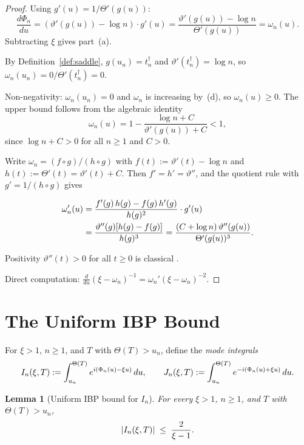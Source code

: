 \documentclass{amsart}
\newcommand{\assign}{:=}
\newcommand{\tmem}[1]{{\em #1\/}}
\newcommand{\tmtextbf}[1]{\text{{\bfseries{#1}}}}
\newtheorem{lemma}{Lemma}
\newcommand{\abs}[1]{\left| #1 \right|}
\begin{document}
\begin{proof}
  \tmtextbf{(a).} Using $g' (u) = 1 / \Theta' (g (u))$:
  \[ \frac{d \Phi_n}{du} = (\vartheta' (g (u)) - \log n) \cdot g' (u) =
     \frac{\vartheta' (g (u)) - \log n}{\Theta' (g (u))} = \omega_n (u) . \]
  Subtracting $\xi$ gives part~(a).
  
  {\noindent}\tmtextbf{(b).} By Definition~\ref{def:saddle}, $g (u_n) =
  t_n^{\dagger}$ and $\vartheta' (t_n^{\dagger}) = \log n$, so $\omega_n (u_n)
  = 0 / \Theta' (t_n^{\dagger}) = 0$.
  
  {\noindent}\tmtextbf{(c).} Non-negativity: $\omega_n (u_n) = 0$ and
  $\omega_n$ is increasing by~(d), so $\omega_n (u) \ge 0$. The upper bound
  follows from the algebraic identity
  \[ \omega_n (u) = 1 - \frac{\log n + C}{\vartheta' (g (u)) + C} < 1, \]
  since $\log n + C > 0$ for all $n \ge 1$ and $C > 0$.
  
  {\noindent}\tmtextbf{(d).} Write $\omega_n = (f \circ g) / (h \circ g)$ with
  $f (t) \assign \vartheta' (t) - \log n$ and $h (t) \assign \Theta' (t) =
  \vartheta' (t) + C$. Then $f' = h' = \vartheta''$, and the quotient rule
  with $g' = 1 / (h \circ g)$ gives
  
  \begin{align*}
    \omega_n' (u) & = \frac{f' (g)  \hspace{0.17em} h (g) - f (g) 
    \hspace{0.17em} h' (g)}{h (g)^2} \cdot g' (u)\\
    & = \frac{\vartheta'' (g)  [h (g) - f (g)]}{h (g)^3} = \frac{(C + \log n)
    \hspace{0.17em} \vartheta'' (g (u))}{\Theta' (g (u))^3} .
  \end{align*}
  
  Positivity $\vartheta'' (t) > 0$ for all $t \ge 0$ is classical
  {\cite[5.15.3]{DLMF}}.
  
  {\noindent}\tmtextbf{(e).} Direct computation: $\tfrac{d}{du} (\xi -
  \omega_n)^{- 1} = \omega_n'  (\xi - \omega_n)^{- 2}$.
\end{proof}

\section{The Uniform IBP Bound}

For $\xi > 1$, $n \ge 1$, and $T$ with $\Theta (T) > u_n$, define the
{\tmem{mode integrals}}
\begin{equation}
  \label{eq:In-Jn} I_n (\xi, T) \assign \int_{u_n}^{\Theta (T)} e^{i (\Phi_n
  (u) - \xi u)}  \hspace{0.17em} du, \qquad J_n (\xi, T) \assign
  \int_{u_n}^{\Theta (T)} e^{- i (\Phi_n (u) + \xi u)}  \hspace{0.17em} du.
\end{equation}
\begin{lemma}
  [Uniform IBP bound for $I_n$]\label{lem:IBP} For every $\xi > 1$, $n \ge 1$,
  and $T$ with $\Theta (T) > u_n$,
  \[ \abs{I_n (\xi, T)} \hspace{0.27em} \le \hspace{0.27em} \frac{2}{\xi - 1}
     . \]
\end{lemma}
\end{document}
